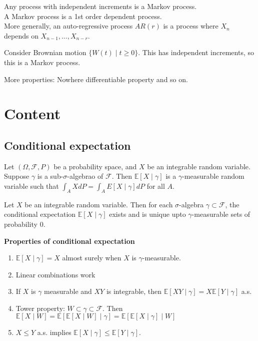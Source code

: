 \documentclass[a4paper]{article}
\newcommand{\nl}{\vspace{0.2cm}\\}
\newcommand{\F}{\mathcal{F}}
\newcommand{\E}{\mathbb{E}}
\begin{document}
Any process with independent increments is a Markov process.\nl
A Markov process is a 1st order dependent process.\nl
More generally, an auto-regressive process $AR(r)$ is a process where $X_n$ depends on $X_{n-1}, \ldots, X_{n-r}$.\nl

\begin{eg}
    Consider Brownian motion $\{W(t) \mid t \ge 0\}$. This has independent increments, so this is a Markov process.
\end{eg}

More properties: Nowhere differentiable property and so on.

\section{Content}

\subsection{Conditional expectation}

Let $(\Omega, \F, P)$ be a probability space, and $X$ be an integrable random variable. Suppose $\gamma$ is a sub-$\sigma$-algebrao of $\F$. Then $\E[X \mid \gamma]$ is a $\gamma$-measurable random
variable such that $\int_A X dP = \int_A E[X \mid \gamma] dP$ for all $A$.\nl

\begin{theorem}
    Let $X$ be an integrable random variable. Then for each $\sigma$-algebra $\gamma \subset \F$, the conditional expectation $\E[X \mid \gamma]$ exists and is unique upto $\gamma$-measurable sets
    of probability $0$.
\end{theorem}

\textbf{Properties of conditional expectation}\nl
\begin{enumerate}
    \item $\E[X \mid \gamma] = X$ almost surely when $X$ is $\gamma$-measurable.
    \item Linear combinations work
    \item If $X$ is $\gamma$ measurable and $XY$ is integrable, then $\E[XY \mid \gamma] = X \E[Y \mid \gamma]$ a.s.
    \item Tower property: $W \subset \gamma \subset \F$. Then $\E[X \mid W] = \E[\E[X \mid W] \mid \gamma] = \E[\E[X \mid \gamma] \mid W]$
    \item $X \le Y$ a.s. implies $\E[X \mid \gamma] \le \E[Y \mid \gamma]$.
\end{enumerate}
\end{document}
